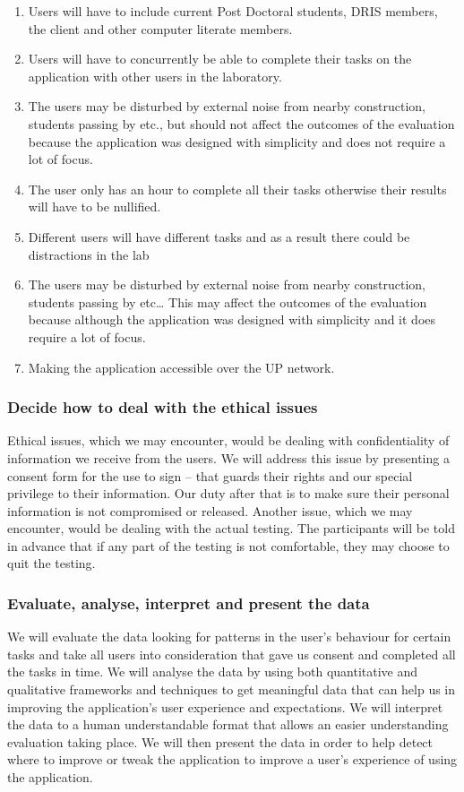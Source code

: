 \documentclass[12pt]{article}
\begin{document}
\begin{flushleft}
\begin{enumerate}
\item	Users will have to include current Post Doctoral students, DRIS members, the client and other computer literate members.
\item Users will have to concurrently be able to complete their tasks on the application with other users in the laboratory.
\item The users may be disturbed by external noise from nearby construction, students passing by etc., but should not affect the outcomes of the evaluation because the application was designed with simplicity and does not require a lot of focus.
\item The user only has an hour to complete all their tasks otherwise their results will have to be nullified. 
\item	Different users will have different tasks and as a result there could be distractions in the lab
\item	The users may be disturbed by external noise from nearby construction, students passing by etc… This may affect the outcomes of the evaluation because although the application was designed with simplicity and it does require a lot of focus.
\item Making the application accessible over the UP network.

\end{enumerate}

\subsubsection{Decide how to deal with the ethical issues}

Ethical issues, which we may encounter, would be dealing with confidentiality of information we receive from the users. We will address this issue by presenting a consent form for the use to sign – that guards their rights and our special privilege to their information. Our duty after that is to make sure their personal information is not compromised or released. Another issue, which we may encounter, would be dealing with the actual testing. The participants will be told in advance that if any part of the testing is not comfortable, they may choose to quit the testing. 

\subsubsection{Evaluate, analyse, interpret and present the data} 

We will evaluate the data looking for patterns in the user’s behaviour for certain tasks and take all users into consideration that gave us consent and completed all the tasks in time. We will analyse the data by using both quantitative and qualitative frameworks and techniques to get meaningful data that can help us in improving the application’s user experience and expectations. We will interpret the data to a human understandable format that allows an easier understanding evaluation taking place. We will then present the data in order to help detect where to improve or tweak the application to improve a user’s experience of using the application. 


\end{flushleft}
\end{document}
